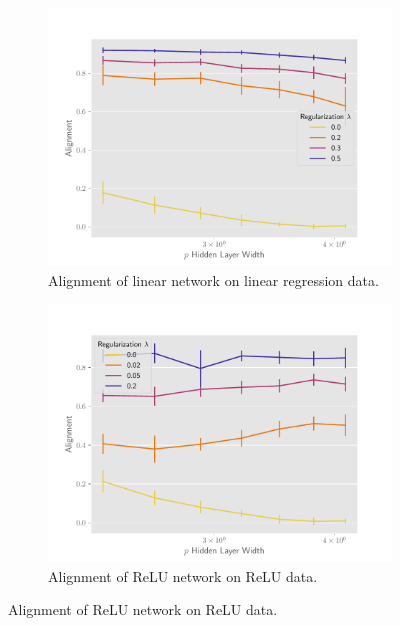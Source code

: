 \begin{figure}[h]
\centering

\begin{subfigure}[b]{.49\textwidth}
  \centering
  \includegraphics[width=\linewidth]{figures/align_lr_non_autograd_l2_v4.pdf}
  \caption{Alignment of linear network on linear regression data.}
  \label{fig:align_lr_non_autograd_l2}
\end{subfigure}\hfill
\begin{subfigure}[b]{.49\textwidth}
  \centering
  \includegraphics[width=\linewidth]{figures/align_nn_relu_autograd_l2_v4.pdf}
  \caption{Alignment of ReLU network on ReLU data.}
  \label{fig:align_nn_relu_autograd_l2}
\end{subfigure}


\end{figure}
